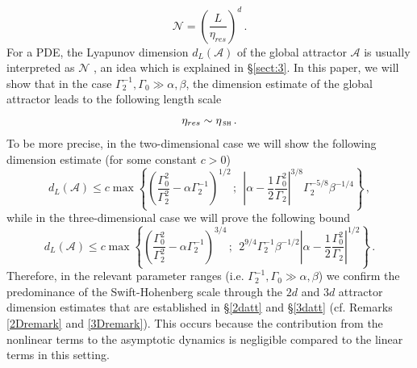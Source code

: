 \documentclass[11pt]{amsart}
\newcommand{\Rb}{\beta}
\newcommand{\Att}{\mathcal{A}}
\newcommand{\Gamzero}{\Gamma_{0}}
\newcommand{\Gamtwo}{\Gamma_{2}}
\newcommand{\bel}{\begin{equation}\label}
\newcommand{\ee}{\end{equation}}
\theoremstyle{definition}
\numberwithin{equation}{section}
\numberwithin{equation}{section}
\begin{document}
\bel{Ndef}
\mathcal{N} = \left(\frac{L}{\eta_{res}}\right)^{d}\,.
\ee
For a PDE, the Lyapunov dimension $d_{L}(\mathcal{A})$ of the global attractor $\mathcal{A}$ is usually interpreted as $\mathcal{N}$ \cite{CFMT}, an idea which is explained in \S\ref{sect:3}. In this paper, we will show that in the case $\Gamtwo^{-1},\Gamzero \gg \alpha, \beta$, the dimension estimate of the global attractor leads to the following length scale
\begin{equation}
\eta_{res} \sim \eta_{\,\textsc{sh}}\,.
\end{equation}
To be more precise, in the two-dimensional case we will show the following dimension estimate (for some constant $c > 0$)
\begin{equation*}
d_L (\Att) \leq c \max \left\{\left(\frac{\Gamzero^2}{\Gamtwo^2} - \alpha \Gamtwo^{-1}\right)^{1/2}\,;
~~\left\lvert \alpha - \frac{1}{2} \frac{\Gamzero^2}{\Gamtwo} \right\rvert^{3/8}\Gamtwo^{-5/8}\Rb^{-1/4}
\right\}\,,
\end{equation*}
while in the three-dimensional case we will prove the following bound
\begin{equation*} 
d_L (\Att) \leq c \max \left\{\left(\frac{\Gamzero^2}{\Gamtwo^{2}} - \alpha \Gamtwo^{-1} \right)^{3/4}\,;~~
2^{9/4}\Gamtwo^{-1} \Rb^{-1/2} \left\lvert \alpha - \frac{1}{2} \frac{\Gamzero^2}{\Gamtwo} \right\rvert^{1/2}\right\}\,.
\end{equation*}
Therefore, in the relevant parameter ranges (i.e. $\Gamtwo^{-1},\Gamzero \gg \alpha, \beta$) we confirm the predominance of the Swift-Hohenberg scale through the $2d$ and $3d$ attractor dimension estimates that are established in \S\ref{2datt} and \S\ref{3datt} (cf. Remarks \ref{2Dremark} and \ref{3Dremark}). This occurs because the contribution from the nonlinear terms to the asymptotic dynamics is negligible compared to the linear terms in this setting. 
\par\smallskip
\end{document}
